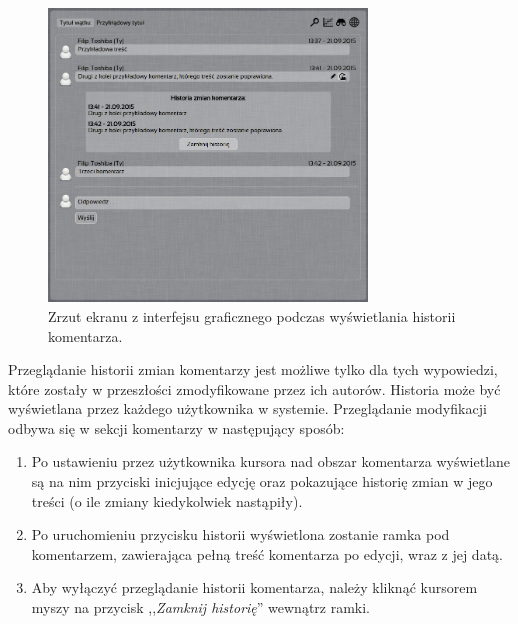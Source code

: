\documentclass[polish,a4paper,twoside]{ppfcmthesis}
\begin{document}
\begin{figure}[h!]
  \vspace{5pt}
  \begin{center}
    \includegraphics[width=240pt]{figures/screenshotcommenthistory1.png}
  \end{center}
  \caption{Zrzut ekranu z interfejsu graficznego podczas wyświetlania historii komentarza.}
\end{figure}

Przeglądanie historii zmian komentarzy jest możliwe tylko dla tych wypowiedzi, które zostały w przeszłości zmodyfikowane przez ich autorów. Historia może być wyświetlana przez każdego użytkownika w systemie. Przeglądanie modyfikacji odbywa się w sekcji komentarzy w następujący sposób:

\begin{enumerate}[noitemsep]
  \item Po ustawieniu przez użytkownika kursora nad obszar komentarza wyświetlane są na nim przyciski inicjujące edycję oraz pokazujące historię zmian w jego treści (o ile zmiany kiedykolwiek nastąpiły).
  
  \item Po uruchomieniu przycisku historii wyświetlona zostanie ramka pod komentarzem, zawierająca pełną treść komentarza po edycji, wraz z jej datą.
  
  \item Aby wyłączyć przeglądanie historii komentarza, należy kliknąć kursorem myszy na przycisk ,,\emph{Zamknij historię}'' wewnątrz ramki.
\end{enumerate}
% 

{\raggedright\sloppy\small}

\ppcolophon
\end{document}
